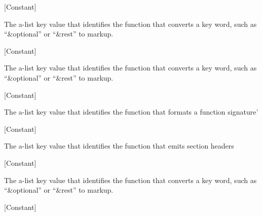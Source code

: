 \vspace{1em}
\noindent
{}
\usebox{\funcname}
 \hfill [Constant]

\begin{doc-string}
The a-list key value that identifies the function that converts a key word, such
as ``\&optional'' or ``\&rest'' to markup.
\end{doc-string}

\vspace{1em}
\noindent
{}
\usebox{\funcname}
 \hfill [Constant]

\begin{doc-string}
The a-list key value that identifies the function that converts a key word, such
as ``\&optional'' or ``\&rest'' to markup.
\end{doc-string}

\vspace{1em}
\noindent
{}
\usebox{\funcname}
 \hfill [Constant]

\begin{doc-string}
The a-list key value that identifies the function that formats a function signature'
\end{doc-string}

\vspace{1em}
\noindent
{}
\usebox{\funcname}
 \hfill [Constant]

\begin{doc-string}
The a-list key value that identifies the function that emits section headers
\end{doc-string}

\vspace{1em}
\noindent
{}
\usebox{\funcname}
 \hfill [Constant]

\begin{doc-string}
The a-list key value that identifies the function that converts a key word, such
as ``\&optional'' or ``\&rest'' to markup.
\end{doc-string}

\vspace{1em}
\noindent
{}
\usebox{\funcname}
 \hfill [Constant]

